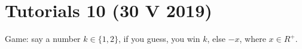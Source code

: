 \section{Tutorials 10 (30 V 2019)}
Game: say a number $k \in \{1, 2\}$, if you guess, you win $k$, else $-x$, where $x \in R^{+}$.